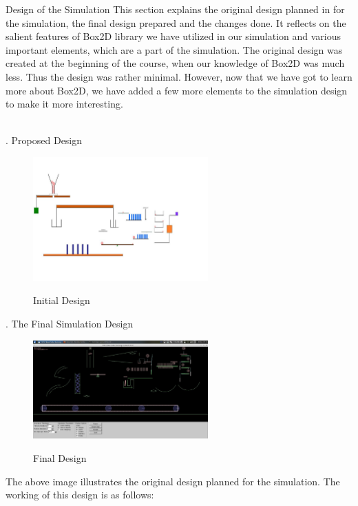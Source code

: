 \documentclass[a4paper,11pt]{resume}
\begin{document}
\begin{rSection}{{\heading Design of the Simulation}}
This section explains the original design planned in for the simulation, the final design prepared and the changes done. It reflects on the salient features of Box2D library we have utilized in our simulation and various important elements, which are a part of the simulation. The original design was created at the beginning of the course, when our knowledge of Box2D was much less. Thus the design was rather minimal. However, now that we have got to learn more about Box2D\cite{var4}, we have added a few more elements to the simulation design to make it more interesting. \\ \\
\begin{rSubsection}{{. Proposed Design}}{}{}{}
\begin{figure}[H]
\centering
\includegraphics[width=0.6\textwidth]{init}
\label{fig:init}
\caption{Initial Design}
\end{figure}
\end{rSubsection}
\newpage
\begin{rSubsection}{{. The Final Simulation Design}}{}{}{}
\begin{figure}[H]
\centering
\includegraphics[width=0.6\textwidth]{screen.jpg}
\label{fig:find}
\caption{Final Design}
\end{figure}
The above image illustrates the original design planned for the simulation. The working of this design is as follows: 
\end{rSubsection}

\end{rSection}
\end{document}

